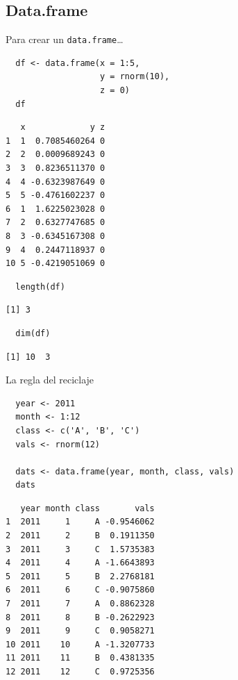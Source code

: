 \documentclass[xcolor={usenames,svgnames,dvipsnames}]{beamer}
\begin{document}
\subsection{Data.frame}
\label{sec-2-4}
\begin{frame}[fragile,label=sec-2-4-1]{Para crear un \texttt{data.frame}\ldots{}}
 \lstset{language=R,label= ,caption= ,numbers=none}
\begin{lstlisting}
  df <- data.frame(x = 1:5,
                   y = rnorm(10),
                   z = 0)
  df
\end{lstlisting}

\begin{verbatim}
   x             y z
1  1  0.7085460264 0
2  2  0.0009689243 0
3  3  0.8236511370 0
4  4 -0.6323987649 0
5  5 -0.4761602237 0
6  1  1.6225023028 0
7  2  0.6327747685 0
8  3 -0.6345167308 0
9  4  0.2447118937 0
10 5 -0.4219051069 0
\end{verbatim}

\lstset{language=R,label= ,caption= ,numbers=none}
\begin{lstlisting}
  length(df)
\end{lstlisting}

\begin{verbatim}
[1] 3
\end{verbatim}

\lstset{language=R,label= ,caption= ,numbers=none}
\begin{lstlisting}
  dim(df)
\end{lstlisting}

\begin{verbatim}
[1] 10  3
\end{verbatim}
\end{frame}

\begin{frame}[fragile,label=sec-2-4-2]{La regla del reciclaje}
 \lstset{language=R,label= ,caption= ,numbers=none}
\begin{lstlisting}
  year <- 2011
  month <- 1:12
  class <- c('A', 'B', 'C')
  vals <- rnorm(12)
  
  dats <- data.frame(year, month, class, vals)
  dats
\end{lstlisting}

\begin{verbatim}
   year month class       vals
1  2011     1     A -0.9546062
2  2011     2     B  0.1911350
3  2011     3     C  1.5735383
4  2011     4     A -1.6643893
5  2011     5     B  2.2768181
6  2011     6     C -0.9075860
7  2011     7     A  0.8862328
8  2011     8     B -0.2622923
9  2011     9     C  0.9058271
10 2011    10     A -1.3207733
11 2011    11     B  0.4381335
12 2011    12     C  0.9725356
\end{verbatim}
\end{frame}
\end{document}
